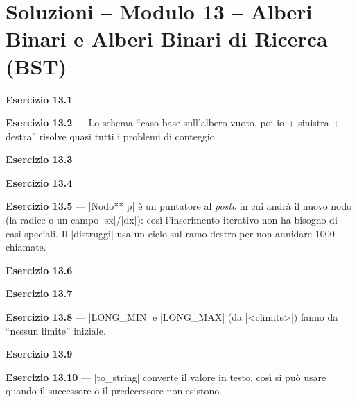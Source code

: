 \chapter{Soluzioni -- Modulo 13 -- Alberi Binari e Alberi Binari di Ricerca (BST)}

\textbf{Esercizio 13.1}

\textbf{Esercizio 13.2} --- Lo schema ``caso base sull'albero vuoto, poi io + sinistra +
destra'' risolve quasi tutti i problemi di conteggio.

\textbf{Esercizio 13.3}

\textbf{Esercizio 13.4}

\textbf{Esercizio 13.5} --- \cc|Nodo** p| è un puntatore al \emph{posto} in cui andrà
il nuovo nodo (la radice o un campo \cc|sx|/\cc|dx|): così l'inserimento iterativo non ha
bisogno di casi speciali. Il \cc|distruggi| usa un ciclo sul ramo destro per non
annidare 1000 chiamate.

\textbf{Esercizio 13.6}

\textbf{Esercizio 13.7}

\textbf{Esercizio 13.8} --- \cc|LONG_MIN| e \cc|LONG_MAX| (da \cc|<climits>|) fanno da
``nessun limite'' iniziale.

\textbf{Esercizio 13.9}

\textbf{Esercizio 13.10} --- \cc|to_string| converte il valore in testo, così si può usare
\q{-} quando il successore o il predecessore non esistono.
